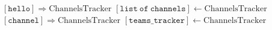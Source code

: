 \documentclass{article}
\begin{document}
\pagestyle{empty}

\newcommand{\send}{\Rightarrow}
\newcommand{\sendto}{\rightarrow}
\algrenewcommand{}

\begin{algorithmic}
  \State $[\mathtt{hello}] \send \mathrm{ChannelsTracker}$
  \State $[\mathtt{list~of~channels}] \gets \mathrm{ChannelsTracker}$
  \State $[\mathtt{channel}] \send \mathrm{ChannelsTracker}$
  \State $[\mathtt{teams\_tracker}] \gets \mathrm{ChannelsTracker}$
  \EndWhile
  \EndProcedure
\end{algorithmic}
\end{document}
